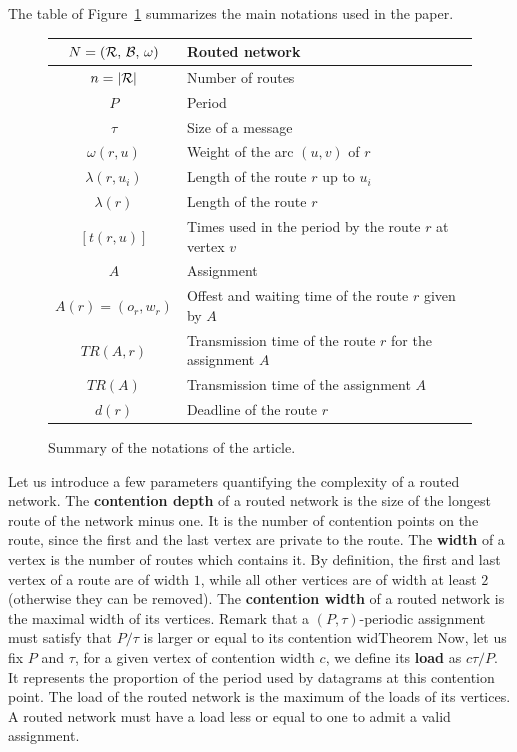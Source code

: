 \documentclass[a4paper,10pt]{article}
\begin{document}
      The table of Figure~\ref{tab:summary} summarizes the main notations used in the paper.
    \begin{figure}
      \begin{center}
    \begin{tabularx}{\textwidth}{|c|X|}
    \hline
     $N = (\cal{R},\,\cal{B},\,\omega)$ & Routed network \\
     \hline
     $n = |\cal{R}|$ & Number of routes\\
     \hline
     $P$ & Period\\
     \hline
     $\tau$ & Size of a message\\
     \hline
     $\omega(r,u)$ & Weight of the arc $(u,v)$ of $r$ \\
     \hline
     $\lambda(r,u_i)$ & Length of the route $r$ up to $u_i$\\
     \hline
     $\lambda(r)$ & Length of the route $r$\\
     \hline
     $ [t(r,u)]$& Times used in the period by the route $r$ at vertex $v$\\
     \hline 
     $A$ & Assignment\\
     \hline 
     $A(r) = (o_r,w_r)$ & Offest and waiting time of the route $r$ given by $A$ \\
     \hline 
     $TR(A,r)$& Transmission time of the route $r$ for the assignment $A$\\
     \hline 
     $TR(A)$& Transmission time of the assignment $A$\\
     \hline
     $d(r)$ & Deadline of the route $r$\\
     \hline

      \end{tabularx}
      \end{center}
      \caption{Summary of the notations of the article.}\label{tab:summary}
    \end{figure}
  	
  	Let us introduce a few parameters quantifying the complexity of a routed network.
	The \textbf{contention depth} of a routed network is the size of the longest route of the network minus one. It is the number of contention points on the route, since the first and the last vertex are private to the route. The \textbf{width} of a vertex is the number of routes which contains it. By definition, 
	the first and last vertex of a route are of width $1$, while all other vertices are of width at least $2$
	(otherwise they can be removed).
	The \textbf{contention width} of a routed network is the maximal width of its vertices. 
	Remark that a $(P,\tau)$-periodic assignment must satisfy that $P/\tau$ is larger or equal to its contention widTheorem Now, let us fix $P$ and $\tau$, for a given vertex of contention width $c$, we define its \textbf{load} as $c\tau/P$. It represents the proportion of the period used by datagrams at this contention point. The load of the routed network is the maximum of the loads of its vertices. A routed network must have a load less or equal to one to admit a valid assignment.
\end{document}
